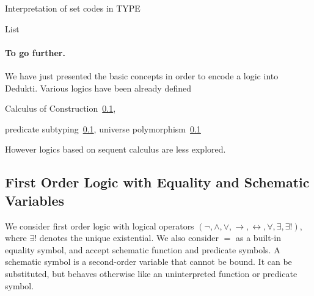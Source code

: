 \documentclass{article}
\begin{document}
	Interpretation of set codes in TYPE
	
	
	
	
	
	
	
	
	
	
	
	
	
	
	
	List
	
	
	
	
	\paragraph{To go further.}
	We have just presented the basic concepts in order to encode a logic into Dedukti.
	Various logics have been already defined
	
	
	
	Calculus of Construction~\ref{}, 
	
	predicate subtyping~\ref{}, universe polymorphism~\ref{}
	
	However logics based on sequent calculus are less explored.
	
	\subsection{First Order Logic with Equality and Schematic Variables}
	We consider first order logic with logical operators $(\neg, \land, \lor, \rightarrow, \leftrightarrow, \forall, \exists, \exists !)$, where $\exists !$ denotes the unique existential. We also consider $=$ as a built-in equality symbol, and accept schematic function and predicate symbols. A schematic symbol is a second-order variable that cannot be bound. It can be substituted, but behaves otherwise like an uninterpreted function or predicate symbol.
	
\end{document}
